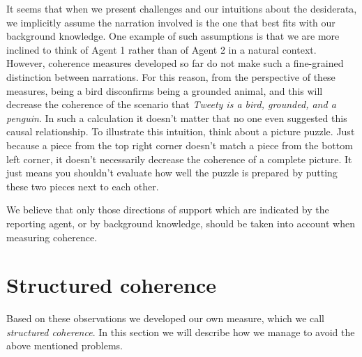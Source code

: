 \documentclass[10pt,]{scrartcl}
\begin{document}
It seems that when we present challenges and our intuitions
about the desiderata, we implicitly assume the narration involved is the
one that best fits with our background knowledge. One example of such assumptions  is that we are more inclined to think of  Agent 1 rather than of 
Agent 2 in a natural context. However, coherence measures developed
so far do not make such a fine-grained distinction between narrations. For this reason, from the perspective of these measures,  being a
bird disconfirms being a grounded animal, and this will decrease the coherence of  the scenario that \textit{Tweety is  a bird,
grounded, and a penguin}. In such a calculation it
doesn't matter that no one even suggested this causal relationship. To
illustrate this intuition, think about a picture puzzle. Just because a
piece from the top right corner doesn't match a piece from the bottom
left corner, it doesn't necessarily decrease the coherence of a complete
picture. It just means you shouldn't evaluate how well the puzzle is
prepared by putting these two pieces next to each other.

We believe that only those directions of support which are indicated by
the reporting agent, or by background knowledge, should be taken into
account when measuring coherence.


\section{Structured coherence}\label{sec:structured}


Based on these observations we developed our own measure, which we call
\textit{structured coherence}. In this section we will describe how we
manage to avoid the above mentioned problems.  
\end{document}
